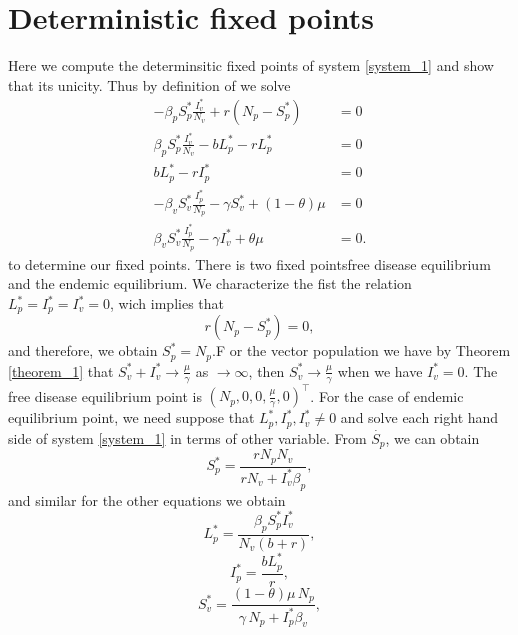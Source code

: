 
\section{Deterministic fixed points}
Here we compute the determinsitic fixed points of system 
\eqref{system_1} and show that its unicity. Thus by definition of we solve 
%
\begin{equation}
	\begin{aligned}
		-\beta_p S_p^* \frac{I_v^*}{N_v} + r(N_p-S_p^*) &= 0\\
		\beta_p S_p^* \frac{I_v^*}{N_v} - b L_p^* - r L_p^* &= 0\\
		b L_p^* - r I_p^* &= 0\\
		-\beta_v S_v^* \frac{I_p^*}{N_p} -\gamma S_v^* +(1-\theta) \mu &= 0\\
		\beta_v S_v^* \frac{I_p^*}{N_p} -\gamma I_v^* + \theta \mu &= 0.
	\end{aligned}
\end{equation}
to determine our fixed points.
%
There is two fixed points\textemdash free disease equilibrium and the 
endemic equilibrium. We characterize the fist the relation
$ L^*_p=I_p^*=I_v^*=0$, wich implies that
%
\begin{equation*}
	r(N_p-S^*_p) = 0,
\end{equation*}
%
and therefore, we obtain $S_p^*=N_p$.F or the vector population we have by 
Theorem \eqref{theorem_1} that $S_v^*+I_v^* \rightarrow \frac{\mu}{\gamma}$ as 
$\rightarrow \infty$, then $S_v^* \rightarrow \frac{\mu}{\gamma}$ when we have 
$I^*_v=0$.
%
The free disease equilibrium point is $(N_p,0,0,\frac{\mu}{\gamma},0)^{\top}$. 
For the case of endemic equilibrium point, we need suppose that $L_p^*,I_p^*,I_
v^*\neq0$ and solve each right hand side of system \eqref{system_1} in terms 
of other variable.
%
From $\dot{S_p}$, we can obtain
%
\begin{equation*}
	S^*_p= \frac{rN_{{p}}N_{{v}}}{rN_{{v}}+I^*_v\beta_{{p}}},
\end{equation*}
%
 and similar for the other equations we obtain
\begin{equation*}
	L^*_p = \frac{\beta_{{p}}S_p^* I_v^*}{N_{{v}} \left( b+r \right)},
\end{equation*}
%
\begin{equation*}
	I^*_p =\frac{b L^*_p}{r},
\end{equation*}
%
\begin{equation*}
	S^*_v =
		\frac{
			\left( 
				1-\theta 
			\right) 
			\mu\, N_{p}
		}{
			\gamma\, N_{p} + I ^ * _ p
			\beta_{v}
		},
\end{equation*}
